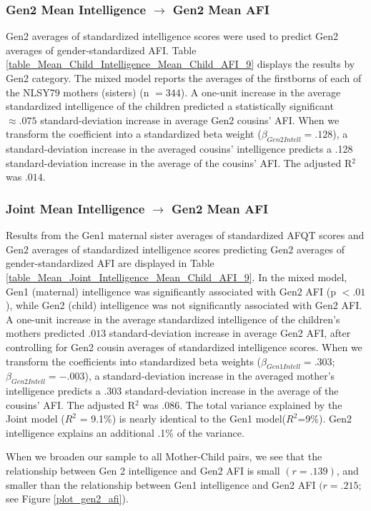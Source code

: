 \documentclass[a4paper,man,apacite,natbib,12pt,longtable]{apa6}\usepackage[]{graphicx}\usepackage[]{color}
\def\hyph{-\penalty0\hskip0pt\relax}  %
\begin{document}
\subsubsection{Gen2 Mean Intelligence $\rightarrow$ Gen2 Mean AFI} Gen2 averages of standardized intelligence scores were used to predict Gen2 averages of gender\hyph standardized AFI. Table \ref{table_Mean_Child_Intelligence_Mean_Child_AFI_9} displays the results by Gen2 category. The mixed model reports the averages of the firstborns of each of the NLSY79 mothers (sisters) (n $= 344$). A one-unit increase in the average standardized intelligence of the children predicted a statistically significant $\approx .075$ standard-deviation increase in average Gen2 cousins' AFI. When we transform the coefficient into a standardized beta weight ($\beta_{Gen2 Intell} = .128$), a standard-deviation increase in the averaged cousins' intelligence predicts a .128 standard-deviation increase in the average of the cousins' AFI. The adjusted R$^{2}$ was $.014$.

\subsubsection{Joint Mean Intelligence $\rightarrow$ Gen2 Mean AFI} Results from the Gen1 maternal sister averages of standardized AFQT scores and Gen2 averages of standardized intelligence scores predicting Gen2 averages of gender\hyph standardized AFI are displayed in Table \ref{table_Mean_Joint_Intelligence_Mean_Child_AFI_9}. In the mixed model, Gen1 (maternal) intelligence was significantly associated with Gen2 AFI (p $< .01$), while Gen2 (child) intelligence was not significantly associated with Gen2 AFI. A one-unit increase in the average standardized intelligence of the children's mothers predicted $.013$ standard-deviation increase in average Gen2 AFI, after controlling for Gen2 cousin averages of standardized intelligence scores. When we transform the coefficients into standardized beta weights ($\beta_{Gen1 Intell} = .303$; $\beta_{Gen2 Intell} = -.003$), a standard-deviation increase in the averaged mother's intelligence predicts a .303 standard-deviation increase in the average of the cousins' AFI. The adjusted R$^{2}$ was $.086$. The total variance explained by the Joint model ($R^{2}$ = 9.1$\%$) is nearly identical to the Gen1 model($R^{2}$=9$\%$). Gen2 intelligence explains an additional .1\% of the variance.

When we broaden our sample to all Mother-Child pairs, we see that the relationship between Gen 2 intelligence and Gen2 AFI is small $(r =.139)$, and smaller than the relationship between Gen1 intelligence and Gen2 AFI $(r=.215$; see Figure \ref{plot_gen2_afi}).
\end{document}
